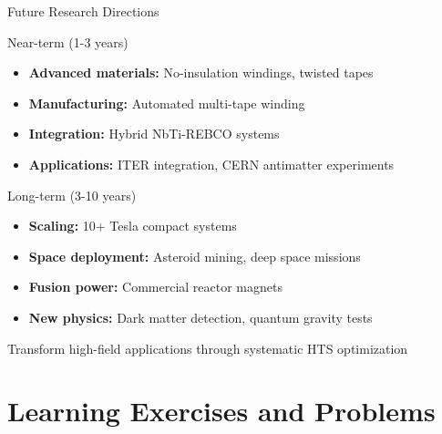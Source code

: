 \begin{frame}{Future Research Directions}
    \begin{block}{Near-term (1-3 years)}
        \begin{itemize}
            \item \textbf{Advanced materials:} No-insulation windings, twisted tapes
            \item \textbf{Manufacturing:} Automated multi-tape winding
            \item \textbf{Integration:} Hybrid NbTi-REBCO systems
            \item \textbf{Applications:} ITER integration, CERN antimatter experiments
        \end{itemize}
    \end{block}
    
    \begin{block}{Long-term (3-10 years)}
        \begin{itemize}
            \item \textbf{Scaling:} 10+ Tesla compact systems
            \item \textbf{Space deployment:} Asteroid mining, deep space missions
            \item \textbf{Fusion power:} Commercial reactor magnets
            \item \textbf{New physics:} Dark matter detection, quantum gravity tests
        \end{itemize}
    \end{block}
    
    \vspace{0.3cm}
     Transform high-field applications through systematic HTS optimization
\end{frame}

\section{Learning Exercises and Problems}

